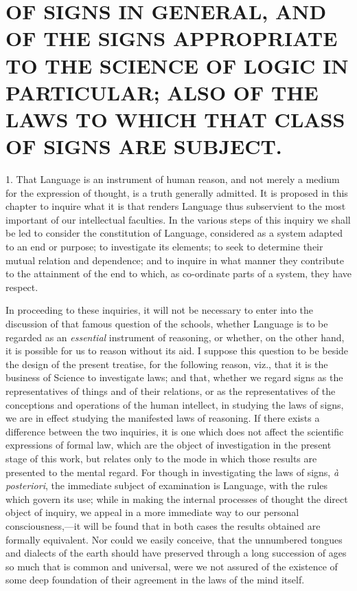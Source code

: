 \documentclass[oneside]{book}
\begin{document}
\chapter[SIGNS AND THEIR LAWS]{\large OF SIGNS IN GENERAL, AND OF THE SIGNS APPROPRIATE TO THE
SCIENCE OF LOGIC IN PARTICULAR; ALSO OF THE LAWS TO WHICH
THAT CLASS OF SIGNS ARE SUBJECT.}

1. That Language is an instrument of human reason, and
not merely a medium for the expression of thought, is a
truth generally admitted. It is proposed in this chapter to inquire
what it is that renders Language thus subservient to the
most important of our intellectual faculties. In the various
steps of this inquiry we shall be led to consider the constitution
of Language, considered as a system adapted to an end or purpose;
to investigate its elements; to seek to determine their mutual
relation and dependence; and to inquire in what manner they
contribute to the attainment of the end to which, as co-ordinate
parts of a system, they have respect.

In proceeding to these inquiries, it will not be necessary to
enter into the discussion of that famous question of the schools,
whether Language is to be regarded as an \textit{essential} instrument
of reasoning, or whether, on the other hand, it is possible for us
to reason without its aid. I suppose this question to be beside
the design of the present treatise, for the following reason, viz.,
that it is the business of Science to investigate laws; and that,
whether we regard signs as the representatives of things and of
their relations, or as the representatives of the conceptions and
operations of the human intellect, in studying the laws of signs,
we are in effect studying the manifested laws of reasoning. If
there exists a difference between the two inquiries, it is one which
does not affect the scientific expressions of formal law, which are
the object of investigation in the present stage of this work, but
relates only to the mode in which those results are presented to
the mental regard. For though in investigating the laws of signs,
\textit{\`{a} posteriori}, the immediate subject of examination is Language,
with the rules which govern its use; while in making the internal
processes of thought the direct object of inquiry, we appeal in a
more immediate way to our personal consciousness,---it will be
found that in both cases the results obtained are formally equivalent.
Nor could we easily conceive, that the unnumbered
tongues and dialects of the earth should have preserved through
a long succession of ages so much that is common and universal,
were we not assured of the existence of some deep foundation of
their agreement in the laws of the mind itself.
\end{document}
